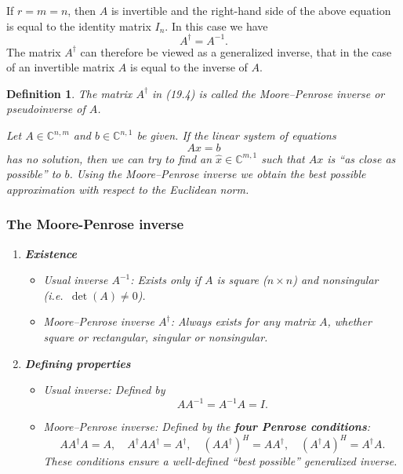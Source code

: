 \documentclass{article}
\newtheorem{definition}{Definition}[section]
\begin{document}
If $r = m = n$, then $A$ is invertible and the right-hand side of the above equation is 
equal to the identity matrix $I_n$. In this case we have 
\[
A^{\dagger} = A^{-1}.
\]
The matrix $A^{\dagger}$ can therefore be viewed as a generalized inverse, that in the case 
of an invertible matrix $A$ is equal to the inverse of $A$.

\vspace{1cm}

\begin{definition}

The matrix $A^{\dagger}$ in (19.4) is called the \emph{Moore--Penrose inverse} 
or \emph{pseudoinverse} of $A$.  

Let $A \in \mathbb{C}^{n,m}$ and $b \in \mathbb{C}^{n,1}$ be given. If the linear system 
of equations
\[
Ax = b
\]
has no solution, then we can try to find an $\hat{x} \in \mathbb{C}^{m,1}$ such that 
$Ax$ is “as close as possible” to $b$. Using the Moore--Penrose inverse we 
obtain the best possible approximation with respect to the Euclidean norm.

\vspace{1cm}

\subsubsection*{The Moore-Penrose inverse}

\begin{enumerate}
    \item \textbf{Existence}
    \begin{itemize}
        \item \emph{Usual inverse $A^{-1}$:} Exists only if $A$ is square ($n \times n$) and nonsingular (i.e.\ $\det(A) \neq 0$).
        \item \emph{Moore--Penrose inverse $A^{\dagger}$:} Always exists for any matrix $A$, whether square or rectangular, singular or nonsingular.
    \end{itemize}

    \item \textbf{Defining properties}
    \begin{itemize}
        \item \emph{Usual inverse:} Defined by
        \[
        A A^{-1} = A^{-1} A = I.
        \]
        \item \emph{Moore--Penrose inverse:} Defined by the \textbf{four Penrose conditions}:
        \[
        A A^{\dagger} A = A, \quad
        A^{\dagger} A A^{\dagger} = A^{\dagger}, \quad
        (A A^{\dagger})^H = A A^{\dagger}, \quad
        (A^{\dagger} A)^H = A^{\dagger} A.
        \]
        These conditions ensure a well-defined ``best possible'' generalized inverse.
    \end{itemize}


\end{enumerate}
\end{definition}
\end{document}
